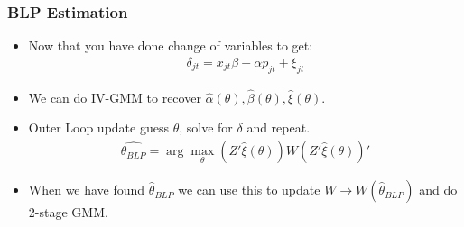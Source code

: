 \documentclass[xcolor=pdftex,dvipsnames,table,mathserif,aspectratio=169]{beamer}
\begin{document}
 \begin{frame}
\frametitle{BLP Estimation}
\begin{itemize}
 \item Now that you have done change of variables to get:
 \begin{eqnarray*}
\delta_{jt}= x_{jt} \beta -\alpha p_{jt}+  \xi_{jt}
 \end{eqnarray*}
 \item We can do IV-GMM to recover $\hat{\alpha}(\theta),\hat{\beta}(\theta),\hat{\xi}(\theta)$.
 \item Outer Loop update guess $\theta$, solve for $\delta$ and repeat.
 \begin{eqnarray*}
 \widehat{\theta_{BLP}} = \arg \max_{\theta} (Z' \hat{\xi}(\theta)) W  (Z' \hat{\xi}(\theta))'
 \end{eqnarray*}
 \item When we have found $\hat{\theta}_{BLP}$ we can use this to update $W \rightarrow W(\hat{\theta}_{BLP})$ and do 2-stage GMM.
 \end{itemize}
\end{frame}
\end{document}
